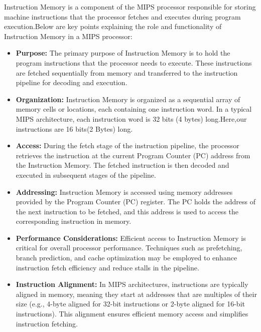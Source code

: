 \documentclass{article}
\begin{document}
\begin{enumerate}
			Instruction Memory is a component of the MIPS processor responsible for storing machine instructions that the processor fetches and executes during program execution.Below are key points explaining the role and functionality of Instruction Memory in a MIPS processor:
			
			\begin{itemize}
				
				
				
				\item \textbf{Purpose:} The primary purpose of Instruction Memory is to hold the program instructions that the processor needs to execute. These instructions are fetched sequentially from memory and transferred to the instruction pipeline for decoding and execution.
				
				\item \textbf{Organization:} Instruction Memory is organized as a sequential array of memory cells or locations, each containing one instruction word. In a typical MIPS architecture, each instruction word is 32 bits (4 bytes) long.Here,our instructions are 16 bits(2 Bytes) long.
				
				\item \textbf{Access:} During the fetch stage of the instruction pipeline, the processor retrieves the instruction at the current Program Counter (PC) address from the Instruction Memory. The fetched instruction is then decoded and executed in subsequent stages of the pipeline.
				
				
				
				\item \textbf{Addressing:} Instruction Memory is accessed using memory addresses provided by the Program Counter (PC) register. The PC holds the address of the next instruction to be fetched, and this address is used to access the corresponding instruction in memory.
				
				\item \textbf{Performance Considerations:} Efficient access to Instruction Memory is critical for overall processor performance. Techniques such as prefetching, branch prediction, and cache optimization may be employed to enhance instruction fetch efficiency and reduce stalls in the pipeline.
				
				\item \textbf{Instruction Alignment:} In MIPS architectures, instructions are typically aligned in memory, meaning they start at addresses that are multiples of their size (e.g., 4-byte aligned for 32-bit instructions or 2-byte aligned for 16-bit instructions). This alignment ensures efficient memory access and simplifies instruction fetching.
			\end{itemize}
			

\end{enumerate}
\end{document}
